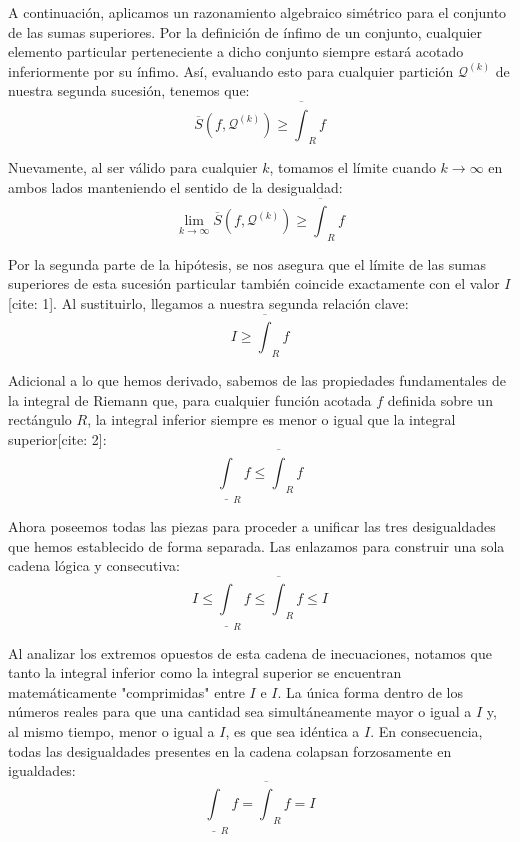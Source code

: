 \documentclass[11pt,letterpaper]{article}
\begin{document}
A continuación, aplicamos un razonamiento algebraico simétrico para el conjunto de las sumas superiores. Por la definición de ínfimo de un conjunto, cualquier elemento particular perteneciente a dicho conjunto siempre estará acotado inferiormente por su ínfimo. Así, evaluando esto para cualquier partición $\mathcal{Q}^{(k)}$ de nuestra segunda sucesión, tenemos que:
\begin{equation*}
\overline{S}(f,\mathcal{Q}^{(k)}) \ge \overline{\int}_{R}f
\end{equation*}

Nuevamente, al ser válido para cualquier $k$, tomamos el límite cuando $k \rightarrow \infty$ en ambos lados manteniendo el sentido de la desigualdad:
\begin{equation*}
\lim_{k\rightarrow\infty} \overline{S}(f,\mathcal{Q}^{(k)}) \ge \overline{\int}_{R}f
\end{equation*}

Por la segunda parte de la hipótesis, se nos asegura que el límite de las sumas superiores de esta sucesión particular también coincide exactamente con el valor $I$[cite: 1]. Al sustituirlo, llegamos a nuestra segunda relación clave:
\begin{equation*}
I \ge \overline{\int}_{R}f
\end{equation*}

Adicional a lo que hemos derivado, sabemos de las propiedades fundamentales de la integral de Riemann que, para cualquier función acotada $f$ definida sobre un rectángulo $R$, la integral inferior siempre es menor o igual que la integral superior[cite: 2]:
\begin{equation*}
\underline{\int}_{R}f \le \overline{\int}_{R}f
\end{equation*}

Ahora poseemos todas las piezas para proceder a unificar las tres desigualdades que hemos establecido de forma separada. Las enlazamos para construir una sola cadena lógica y consecutiva:
\begin{equation*}
I \le \underline{\int}_{R}f \le \overline{\int}_{R}f \le I
\end{equation*}

Al analizar los extremos opuestos de esta cadena de inecuaciones, notamos que tanto la integral inferior como la integral superior se encuentran matemáticamente "comprimidas" entre $I$ e $I$. La única forma dentro de los números reales para que una cantidad sea simultáneamente mayor o igual a $I$ y, al mismo tiempo, menor o igual a $I$, es que sea idéntica a $I$. En consecuencia, todas las desigualdades presentes en la cadena colapsan forzosamente en igualdades:
\begin{equation*}
\underline{\int}_{R}f = \overline{\int}_{R}f = I
\end{equation*}
\end{document}
